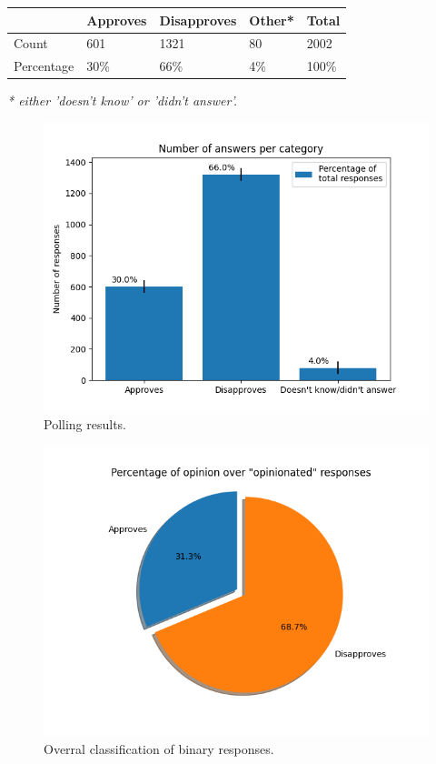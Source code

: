 \documentclass[conference]{IEEEtran}
\begin{document}
\begin{center}
\begin{tabular}{lllll}
 & Approves & Disapproves & Other* & Total\\
\hline
Count & 601 & 1321 & 80 & 2002\\
Percentage & 30\% & 66\% & 4\% & 100\%\\
\end{tabular}
\end{center}
\emph{* either 'doesn't know' or 'didn't answer'.}

\begin{figure}[H]
\centering
\includegraphics[width=\linewidth]{./ValsIPEC.png}
\caption{\label{fig:polls}Polling results.}
\end{figure}

\begin{figure}[H]
\centering
\includegraphics[width=\linewidth]{./piePoll.png}
\caption{\label{fig:nonneutral}Overral classification of binary responses.}
\end{figure}
\end{document}
